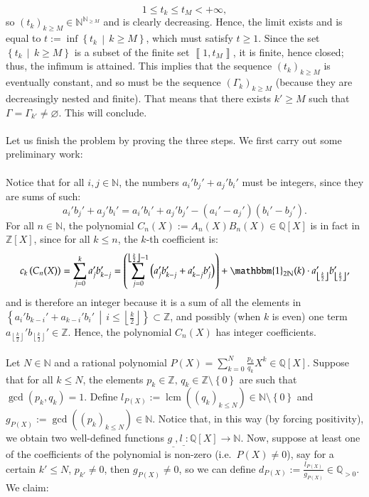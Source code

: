 \documentclass[11pt, a4paper, oneside]{article}
\theoremstyle{remark}
\theoremstyle{lemma}
\begin{document}
\[
1 \leq t_k \leq t_M < +\infty,
\]
so \( \left( t_k \right)_{k \geq M} \in \mathbb{N}^{\mathbb{N}_{\geq M}} \) and is clearly decreasing. Hence, the limit exists and is equal to \( t := \inf \left\{ t_k \,\middle|\, k \geq M \right\} \), which must satisfy \( t \geq 1 \). Since the set \( \left\{ t_k \,\middle|\, k \geq M \right\} \) is a subset of the finite set \(\left\llbracket1, t_{M}\right\rrbracket\), it is finite, hence closed; thus, the infimum is attained. This implies that the sequence \( \left( t_k \right)_{k \geq M} \) is eventually constant, and so must be the sequence \( \left( \Gamma_k \right)_{k \geq M} \) (because they are decreasingly nested and finite). That means that there exists \( k' \geq M \) such that \( \Gamma = \Gamma_{k'}\neq\varnothing \). This will conclude.
\\\\
Let us finish the problem by proving the three steps. We first carry out some preliminary work:
\\\\
Notice that for all \( i, j \in \mathbb{N} \), the numbers \( a_i'b_j' + a_j'b_i' \) must be integers, since they are sums of such:
\[
a_i'b_j' + a_j'b_i' = a_i'b_i' + a_j'b_j' - \left( a_i' - a_j' \right)\left( b_i' - b_j' \right).
\]
For all \( n \in \mathbb{N} \), the polynomial \( C_n(X) := A_n(X) B_n(X) \in \mathbb{Q}[X] \) is in fact in \( \mathbb{Z}[X] \), since for all \( k \leq n \), the \( k \)-th coefficient is:
\[
c_k\left( C_n(X) \right) = \sum_{j=0}^{k} a_j' b_{k-j}' = \left( \sum_{j=0}^{\left\lfloor \frac{k}{2} \right\rfloor - 1} \left( a_j' b_{k-j}' + a_{k-j}' b_j' \right) \right) + \mathbbm{1}_{2\mathbb{N}}(k) \cdot a_{\left\lfloor \frac{k}{2} \right\rfloor}' b_{\left\lfloor \frac{k}{2} \right\rfloor}',
\]
and is therefore an integer because it is a sum of all the elements in \( \left\{ a_i' b_{k-i}' + a_{k-i}' b_i' \,\middle|\, i \leq \left\lfloor \frac{k}{2} \right\rfloor \right\} \subset \mathbb{Z} \), and possibly (when \( k \) is even) one term \( a_{\left\lfloor \frac{k}{2} \right\rfloor}' b_{\left\lfloor \frac{k}{2} \right\rfloor}' \in \mathbb{Z} \). Hence, the polynomial \( C_n(X) \) has integer coefficients.
\\\\
Let \( N \in \mathbb{N} \) and a rational polynomial \( P(X) = \sum_{k=0}^{N} \frac{p_k}{q_k} X^{k} \in \mathbb{Q}[X] \). Suppose that for all \( k \leq N \), the elements \( p_k \in \mathbb{Z},\, q_k \in \mathbb{Z} \setminus \left\{ 0 \right\} \) are such that \( \gcd(p_k, q_k) = 1 \). Define \( l_{P(X)} := \operatorname{lcm}\left( \left( q_k \right)_{k \leq N} \right) \in \mathbb{N} \setminus \left\{ 0 \right\} \) and \( g_{P(X)} := \gcd\left( \left( p_k \right)_{k \leq N} \right) \in \mathbb{N} \). Notice that, in this way (by forcing positivity), we obtain two well-defined functions \( g_{\_}, l_{\_} : \mathbb{Q}[X] \rightarrow \mathbb{N} \). Now, suppose at least one of the coefficients of the polynomial is non-zero (i.e.\ \( P(X)\neq 0 \)), say for a certain \( k' \leq N \), \( p_{k'} \neq 0 \), then \( g_{P(X)} \neq 0 \), so we can define \( d_{P(X)} := \frac{l_{P(X)}}{g_{P(X)}} \in \mathbb{Q}_{>0} \). We claim:
\end{document}

